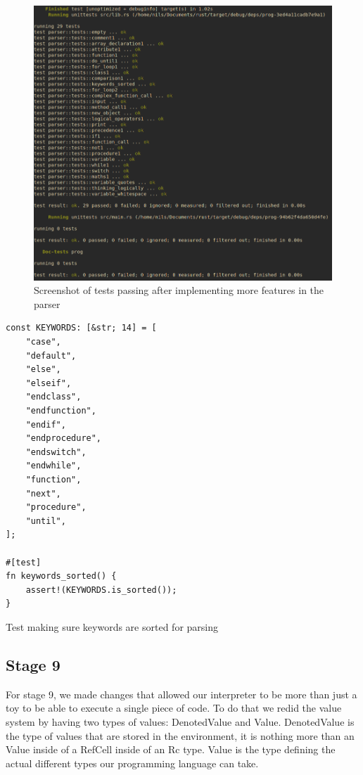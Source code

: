 \documentclass{article}
\begin{document}
\begin{figure}
	\includegraphics[width=\textwidth]{stage8_test}
	\caption{Screenshot of tests passing after implementing more features in
	the parser}
	\label{fig:stage8_test}
\end{figure}

\begin{listing}
	\begin{verbatim}
const KEYWORDS: [&str; 14] = [
    "case",
    "default",
    "else",
    "elseif",
    "endclass",
    "endfunction",
    "endif",
    "endprocedure",
    "endswitch",
    "endwhile",
    "function",
    "next",
    "procedure",
    "until",
];

#[test]
fn keywords_sorted() {
	assert!(KEYWORDS.is_sorted());
}
	\end{verbatim}
	\caption{Test making sure keywords are sorted for parsing}
	\label{lst:sorted_keywords}
\end{listing}

\subsection{Stage 9}

For stage 9, we made changes that allowed our interpreter to be more than just
a toy to be able to execute a single piece of code. To do that we redid the
value system by having two types of values: DenotedValue and Value.
DenotedValue is the type of values that are stored in the environment, it is
nothing more than an Value inside of a RefCell inside of an Rc type. Value
is the type defining the actual different types our programming language can
take.
\end{document}

